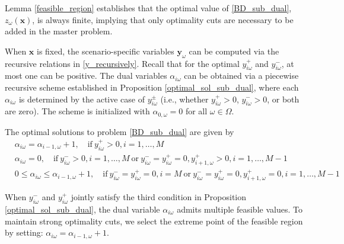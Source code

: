 Lemma \ref{feasible_region} establishes that the optimal value of \eqref{BD_sub_dual}, $z_{\omega}(\mathbf{x})$, is always finite, implying that only optimality cuts are necessary to be added in the master problem.

When $\mathbf{x}$ is fixed, the scenario-specific variables $\mathbf{y}_{\omega}$ can be computed via the recursive relations in \eqref{y_recursively}. Recall that for the optimal $y_{i \omega}^{+}$ and $y_{i \omega}^{-}$, at most one can be positive. The dual variables $\alpha_{i \omega}$ can be obtained via a piecewise recursive scheme established in Proposition \ref{optimal_sol_sub_dual}, where each $\alpha_{i \omega}$ is determined by the active case of $y_{i \omega}^{\pm}$ (i.e., whether $y_{i \omega}^{+}>0$, $y_{i \omega}^{-}>0$, or both are zero). The scheme is initialized with $\alpha_{0, \omega} = 0$ for all $\omega \in \Omega$.
 

 \begin{prop}\label{optimal_sol_sub_dual}
   The optimal solutions to problem \eqref{BD_sub_dual} are given by 
 \begin{equation}\label{BD_sub_simplified}
   \begin{aligned}
    & \alpha_{i \omega} = \alpha_{i-1, \omega}+1, \quad  \text{if}~ y_{i \omega}^{+} > 0, i =1,\ldots, M \\
     & \alpha_{i \omega} = 0, \quad  \text{if}~  y_{i \omega}^{-} > 0,  i =1,\ldots, M~\text{or}~ y_{i \omega}^{-} = y_{i \omega}^{+} = 0, y_{i+1, \omega}^{+}> 0, i = 1,\ldots, M-1 \\
     & 0 \leq \alpha_{i \omega} \leq \alpha_{i-1, \omega}+1, \quad  \text{if}~ y_{i \omega}^{-} = y_{i \omega}^{+} = 0, i = M~\text{or}~ y_{i \omega}^{-} = y_{i \omega}^{+} = 0, y_{i+1, \omega}^{+}= 0, i = 1,\ldots, M-1
   \end{aligned}
 \end{equation}
 \end{prop}


When $y_{i \omega}^{-}$ and $y_{i \omega}^{+}$ jointly satisfy the third condition in Proposition \ref{optimal_sol_sub_dual}, the dual variable $\alpha_{i \omega}$ admits multiple feasible values. To maintain strong optimality cuts, we select the extreme point of the feasible region by setting: $\alpha_{i \omega} = \alpha_{i-1, \omega}+1$.



